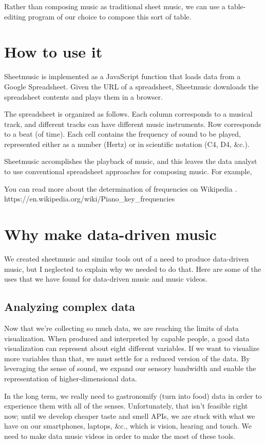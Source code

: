 \documentclass{acm_proc_article-sp}
\begin{document}
Rather than composing music as traditional sheet music,
we can use a table-editing program of our choice to compose
this sort of table.

\section{How to use it}
Sheetmusic is implemented as a JavaScript function that loads data
from a Google Spreadsheet. Given the URL of a spreadsheet, Sheetmusic
downloads the spreadsheet contents and plays them in a browser.

The spreadsheet is organized as follows. Each column corresponds
to a musical track, and different tracks can have different music instruments.
Row corresponds to a beat (of time).
Each cell contains the frequency of sound to be played, represented
either as a number (Hertz) or in scientific notation (C4, D4, \&c.).

Sheetmusic accomplishes the playback of music, and this leaves
the data analyst to use conventional spreadsheet approaches for
composing music. For example, 

You can read more about the determination of frequencies on Wikipedia \cite{piano}.
https://en.wikipedia.org/wiki/Piano\_key\_frequencies

\section{Why make data-driven music}
We created sheetmusic and similar tools out of a need to produce
data-driven music, but I neglected to explain why we needed to do
that. Here are some of the uses that we have found for data-driven
music and music videos.

\subsection{Analyzing complex data}
Now that we're collecting so much data, we are reaching the limits of
data visualization. When produced and interpreted by capable people,
a good data visualization can represent about eight different variables.
If we want to visualize more variables than that, we must settle for
a reduced version of the data. By leveraging the sense of sound,
we expand our sensory bandwidth and enable the representation of
higher-dimensional data.

In the long term, we really need to gastronomify (turn into food)
data in order to experience them with all of the senses.
Unfortunately, that isn't feasible right now;
until we develop cheaper taste and smell APIs, we are stuck with what we have
on our smartphones, laptops, \&c., which is vision, hearing and touch. We need
to make data music videos in order to make the most of these tools.
\end{document}
